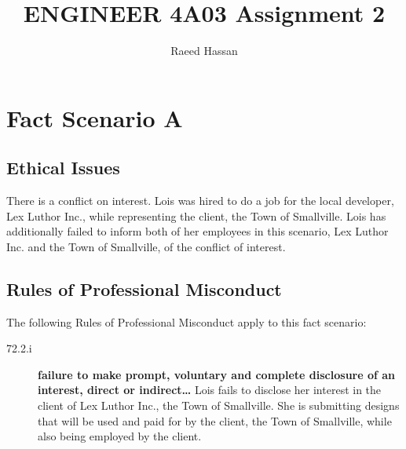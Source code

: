 \documentclass[12pt,letterpaper]{article}
\title{ENGINEER 4A03 Assignment 2}
\author{Raeed Hassan}
\begin{document}
\maketitle
\clearpage

\section*{Fact Scenario A}
\subsection*{Ethical Issues}
There is a conflict on interest. Lois was hired to do a job for the local developer, Lex Luthor Inc., while representing the client, the Town of Smallville. Lois has additionally failed to inform both of her employees in this scenario, Lex Luthor Inc. and the Town of Smallville, of the conflict of interest.

\subsection*{Rules of Professional Misconduct}
The following Rules of Professional Misconduct apply to this fact scenario:
\begin{description}
	\item[72.2.i] \textbf{failure to make prompt, voluntary and complete disclosure of an interest, direct or indirect\dots} Lois fails to disclose her interest in the client of Lex Luthor Inc., the Town of Smallville. She is submitting designs that will be used and paid for by the client, the Town of Smallville, while also being employed by the client.
\end{description}
\end{document}
